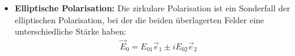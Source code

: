 \begin{itemize}
    \item \textbf{Elliptische Polarisation:} Die zirkulare Polarisation ist ein Sonderfall der elliptischen Polarisation, bei der die beiden überlagerten Felder eine unterschiedliche Stärke haben:
          \begin{align*}
              \vec E_0 = E_{01}\vec e_1 \pm i E_{02}\vec e_2
          \end{align*}


\end{itemize}